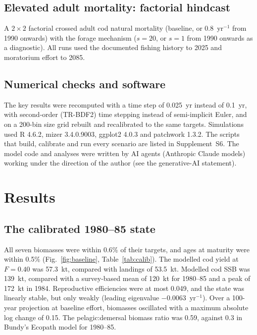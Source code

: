 \documentclass[12pt,letterpaper,fleqn]{article}
\newcommand{\yr}{yr$^{-1}$}
\begin{document}
\subsection{Elevated adult mortality: factorial hindcast}

A $2\times2$ factorial crossed adult cod natural mortality (baseline, or 0.8~\yr{} from 1990 onwards) with the forage mechanism ($s=20$, or $s=1$ from 1990 onwards as a diagnostic). All runs used the documented fishing history to 2025 and moratorium effort to 2085.

\subsection{Numerical checks and software}

The key results were recomputed with a time step of 0.025~yr instead of 0.1~yr, with second-order (TR-BDF2) time stepping instead of semi-implicit Euler, and on a 200-bin size grid rebuilt and recalibrated to the same targets. Simulations used R 4.6.2, mizer 3.4.0.9003, ggplot2 4.0.3 and patchwork 1.3.2. The scripts that build, calibrate and run every scenario are listed in Supplement~S6. The model code and analyses were written by AI agents (Anthropic Claude models) working under the direction of the author (see the generative-AI statement).

\section{Results}

\subsection{The calibrated 1980--85 state}

All seven biomasses were within 0.6\% of their targets, and ages at maturity were within 0.5\% (Fig.~\ref{fig:baseline}, Table~\ref{tab:calib}). The modelled cod yield at $F=0.40$ was 57.3~kt, compared with landings of 53.5~kt. Modelled cod SSB was 139~kt, compared with a survey-based mean of 120~kt for 1980--85 and a peak of 172~kt in 1984. Reproductive efficiencies were at most 0.049, and the state was linearly stable, but only weakly (leading eigenvalue $-0.0063$~\yr{}). Over a 100-year projection at baseline effort, biomasses oscillated with a maximum absolute log change of 0.15. The pelagic:demersal biomass ratio was 0.59, against 0.3 in Bundy's Ecopath model for 1980--85.
\end{document}
